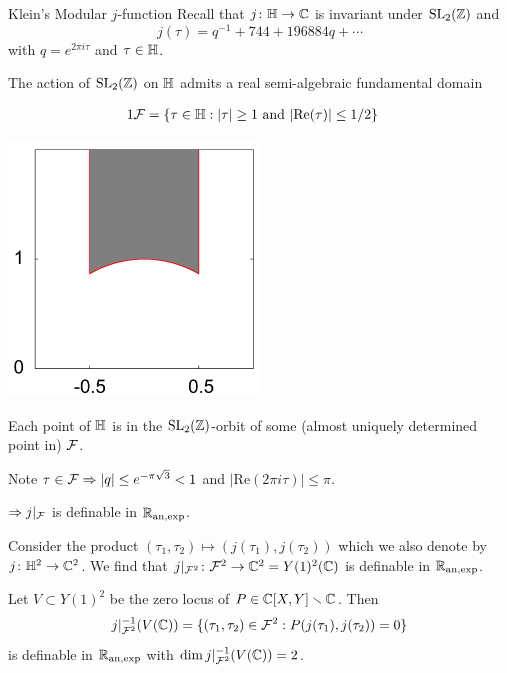 \documentclass{beamer}
\begin{document}
\begin{frame}{Klein's Modular $j$-function}
   Recall that $j\colon {\mathbb{H}}\rightarrow{\mathbb{C}}$ is invariant under
    $\mathrm{SL}_2({\mathbb{Z}})$ and
    $$j(\tau)=q^{-1}+744+196884q+\cdots$$
    with $q = e^{2\pi i \tau}$ and $\tau\in{\mathbb{H}}$.

  The action of $\mathrm{SL}_2({\mathbb{Z}})$ on ${\mathbb{H}}$ admits a real semi-algebraic
  fundamental domain
  
  \begin{minipage}{0.5\linewidth}
  \begin{alignat*}1
    \cF = \{ \tau\in \IH: |\tau|\ge 1 \text{ and }
    &|\mathrm{Re}(\tau)|\le 1/2\}
  \end{alignat*}
  \end{minipage} \hfill \begin{minipage}{0.35\textwidth}
    \includegraphics[width=0.5\textwidth]{fd.png}
  \end{minipage}

  Each point of ${\mathbb{H}}$ is in the $\mathrm{SL}_2({\mathbb{Z}})$-orbit of some
  (almost uniquely determined point in)
  ${\mathcal F}$.  
  
  Note $\tau\in {\mathcal F} \Rightarrow |q| \le e^{-\pi \sqrt{3}}<1$ and $|\mathrm{Re}(2\pi
  i \tau)| \le \pi$. 

  $\Rightarrow j|_{{\mathcal F}}$ is definable in ${{\mathbb{R}}_{\mathrm{an,exp}}}$. 
\end{frame}

\begin{frame}
  Consider the product $(\tau_1,\tau_2)\mapsto
  (j(\tau_1),j(\tau_2))$ which we also denote by
  $j\colon{\mathbb{H}}^2\rightarrow{\mathbb{C}}^2$. We find that
  $j|_{{\mathcal F}^2}\colon {\mathcal F}^2\rightarrow{\mathbb{C}}^2=Y(1)^2({\mathbb{C}})$ is definable in ${{\mathbb{R}}_{\mathrm{an,exp}}}$.

  Let $V \subset Y(1)^2$ be the zero locus of $P\in {\mathbb{C}}[X,Y]\smallsetminus{\mathbb{C}}$. 
  Then 
  \begin{equation*}
    j|_{{\mathcal F}^2}^{-1}(V({\mathbb{C}})) = \{(\tau_1,\tau_2)\in{\mathcal F}^2 :
    P(j(\tau_1),j(\tau_2))=0\} 
  \end{equation*}
  is definable in ${{\mathbb{R}}_{\mathrm{an,exp}}}$ with $\dim j|_{{\mathcal F}^2}^{-1}(V({\mathbb{C}})) =
  2$.  
\end{frame}
\end{document}

